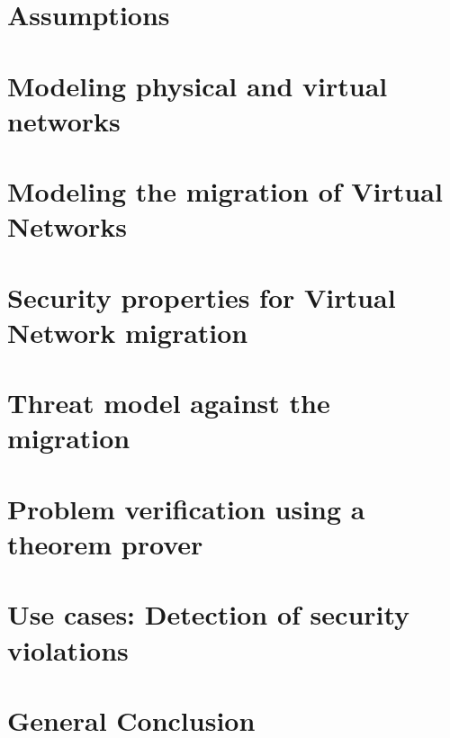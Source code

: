 \documentclass[a4paper, 11pt]{report}
\theoremstyle{definition}
\begin{document}
% 

\section{Assumptions}


\newpage
\section{Modeling physical and virtual networks}


\newpage
\section{Modeling the migration of Virtual Networks}


\newpage
\section{Security properties for Virtual Network migration}




\section{Threat model against the migration}


\section{Problem verification using a theorem prover}


\section{Use cases: Detection of security violations}


\newpage
\section{General Conclusion}

\end{document}
